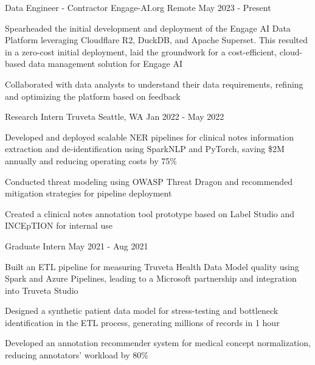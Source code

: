 
\begin{cventries}
	\cventry
	{Data Engineer - Contractor}
	{Engage-AI.org}
	{Remote}
	{May 2023 - Present}
	{\begin{cvitems}
			\item {Spearheaded the initial development and deployment of the Engage AI Data Platform leveraging Cloudflare R2, DuckDB, and Apache Superset. This resulted in a zero-cost initial deployment, laid the groundwork for a cost-efficient, cloud-based data management solution for Engage AI}
			\item {Collaborated with data analysts to understand their data requirements, refining and optimizing the platform based on feedback}
		\end{cvitems}}
	\vspace{-1mm}

	\cventry
	{Research Intern}
	{Truveta}
	{Seattle, WA}
	{Jan 2022 - May 2022}
	{\begin{cvitems}
			\item {Developed and deployed scalable NER pipelines for clinical notes information extraction and de‑identification using SparkNLP and PyTorch, saving \$2M annually and reducing operating costs by 75\%}
			\item {Conducted threat modeling using OWASP Threat Dragon and recommended mitigation strategies for pipeline deployment}
			\item {Created a clinical notes annotation tool prototype based on Label Studio and INCEpTION for internal use}
		\end{cvitems}}
	\vspace{1mm}
	\cventry
	{Graduate Intern}
	{}
	{}
	{May 2021 - Aug 2021}
	{\begin{cvitems}
			\item {Built an ETL pipeline for measuring Truveta Health Data Model quality using Spark and Azure Pipelines, leading to a Microsoft partnership and integration into Truveta Studio}
			\item {Designed a synthetic patient data model for stress-testing and bottleneck identification in the ETL process, generating millions of records in 1 hour}
			\item {Developed an annotation recommender system for medical concept normalization, reducing annotators' workload by 80\%}
		\end{cvitems}}


\end{cventries}
